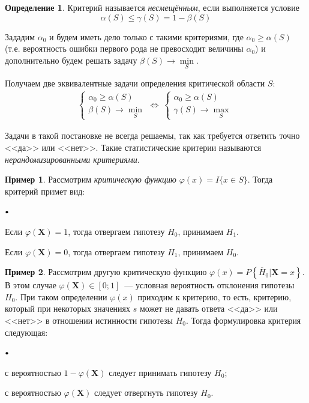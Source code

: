 \documentclass[oneside,final,14pt]{extreport}
\theoremstyle{plain}
\theoremstyle{definition}
\newtheorem*{defn}{Определение}
\newtheorem*{exmp}{Пример}
\theoremstyle{named}
\newcommand\sbullet[1][.5]{\mathbin{\vcenter{\hbox{\scalebox{#1}{$\bullet$}}}}}
\newenvironment{compactlist}{
\begin{list}{{$\sbullet[.75]$}}{
\setlength\partopsep{0pt}
\setlength\parskip{0pt}
\setlength\parsep{0pt}
\setlength\topsep{0pt}
\setlength\itemsep{0pt}
}
}{
\end{list}
}
\begin{document}
\begin{defn}
    Критерий называется {\it несмещённым}, если выполняется условие
    \begin{equation*}
        \alpha(S) \leqslant \gamma(S)=1-\beta(S)
    \end{equation*}
\end{defn}

Зададим $\alpha_0$ и будем иметь дело только с такими критериями, где $\alpha_{0} \geqslant \alpha(S)$ (т.е. вероятность ошибки первого рода не превосходит величины $\alpha_0$) и дополнительно будем решать задачу $\beta(S) \rightarrow \min\limits_{S}$.

Получаем две эквивалентные задачи определения критической области $S$:
\begin{equation*}
    \begin{array}{l}
    \left\{\begin{array}{l}
    \alpha_{0} \geqslant \alpha(S) \\
    \beta(S) \rightarrow \min\limits_{S}
    \end{array}\right.
    \Leftrightarrow~
    \left\{\begin{array}{l}
    \alpha_{0} \geqslant \alpha(S) \\
    \gamma(S) \rightarrow \max\limits_{S}
    \end{array}\right.
    \end{array}
\end{equation*}

Задачи в такой постановке не всегда решаемы, так как требуется ответить точно <<да>> или <<нет>>. Такие статистические критерии называются {\it нерандомизированными критериями}.

\begin{exmp}
Рассмотрим {\it критическую функцию} $\varphi(x)=I\{x \in S\}$. Тогда критерий примет вид:
\begin{compactlist}
    \item Если $\varphi\left(\mathbf{X}\right)=1$, тогда отвергаем гипотезу $H_0$, принимаем $H_1$.
    \item Если $\varphi\left(\mathbf{X}\right)=0$, тогда отвергаем гипотезу $H_1$, принимаем $H_0$.
\end{compactlist}
\end{exmp}

\begin{exmp}
Рассмотрим другую критическую функцию $\varphi(x)=P\left\{\overline{H}_{0} | \mathbf{X}=x\right\}$. В этом случае $\varphi\left(\mathbf{X}\right) \in[0;1]$~--- условная вероятность отклонения гипотезы $H_0$. При таком определении $\varphi(x)$ приходим к { критерию}, то есть, критерию, который при некоторых значениях $s$ может не давать ответа <<да>> или <<нет>> в отношении истинности гипотезы $H_0$. Тогда формулировка критерия следующая:
\begin{compactlist}
    \item с вероятностью $1 - \varphi\left(\mathbf{X}\right)$ следует принимать гипотезу $H_0$;
    \item с вероятностью $\varphi\left(\mathbf{X}\right)$ следует отвергнуть гипотезу $H_0$.
\end{compactlist}
\end{exmp}
\end{document}
